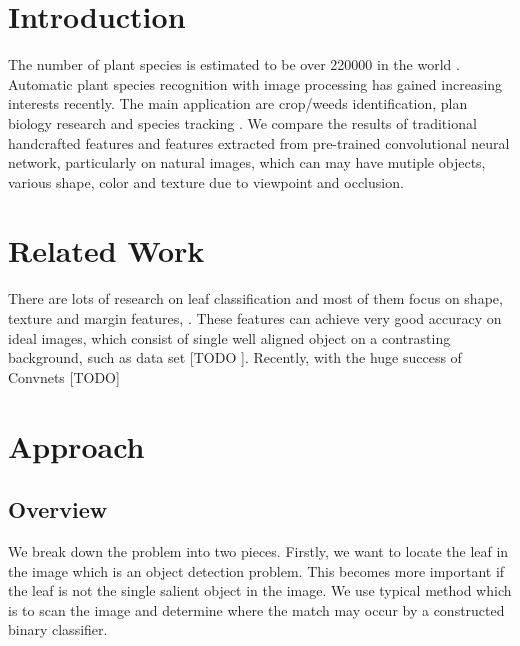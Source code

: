 \documentclass[journal]{IEEEtran}
\begin{document}
\section{Introduction}
The number of plant species is estimated to be over 220000 in the world \cite{Charles13}. 
Automatic plant species recognition with image processing has gained increasing
interests recently. The main application are crop/weeds identification, plan biology research and species tracking \cite{Pedro13}. 
We compare the results of traditional handcrafted features and features extracted from pre-trained convolutional neural network, particularly on natural images, which can may have mutiple objects, various shape, color and texture due to viewpoint and occlusion.



\section{Related Work }
There are lots of research on leaf classification and most of them focus on shape, texture and margin features,  \cite{Charles13} \cite{Pedro13}. These features can achieve very good accuracy on ideal images, which consist of single well aligned object on a contrasting background, such as data set [TODO ].
Recently, with the huge success of Convnets [TODO]


\section{Approach}

\subsection{Overview}


We break down the problem into two pieces. Firstly, we want to locate the leaf in the image which is an object detection problem. This becomes more important if the leaf is not the single salient object in the image. We use typical method which is to scan the image and determine where the match may occur by a constructed binary classifier.  
\end{document}

